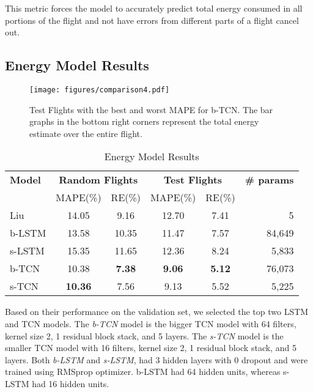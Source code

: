 \documentclass[letterpaper, 10 pt, conference]{ieeeconf}
\begin{document}
This metric forces the model to accurately predict total energy consumed in all portions of the flight and not have errors from different parts of a flight cancel out.


\subsection{Energy Model Results} \label{deep_results}
\begin{figure}
    \centering
    \texttt{[image: figures/comparison4.pdf]} 
\caption{Test Flights with the best and worst MAPE for b-TCN. The bar graphs in the bottom right corners represent the total energy estimate over the entire flight.}
    \label{fig:comparison}
\end{figure}
\begin{table}
    \centering
    \caption{Energy Model Results}
    \vspace{-2.5mm}
    \begin{tabular}{lccccr}
    \toprule
         \textbf{Model} & \multicolumn{2}{c}{\textbf{Random Flights}} & \multicolumn{2}{c}{\textbf{Test Flights}} & \textbf{\# params} \\
     \cmidrule{2-5}
          & MAPE(\%) & RE(\%) & MAPE(\%) & RE(\%) & \\
\midrule
    Liu \cite{liu2017power} &  14.05 & 9.16 &  12.70 & 7.41  &   5 \\
    b-LSTM &  13.58 & 10.35 &  11.47 & 7.57  &  84,649 \\
    s-LSTM &  15.35 & 11.65 &  12.36 & 8.24  &  5,833 \\
    b-TCN &   10.38 & \textbf{7.38} &  \textbf{9.06} & \textbf{5.12}  &   76,073 \\
    s-TCN &   \textbf{10.36} & 7.56 &  9.13 & 5.52 &  5,225 \\
    \bottomrule
    \end{tabular}
    \label{tab:comparison}
    \vspace{-2.5mm}
\end{table}

Based on their performance on the validation set, we selected the top two LSTM and TCN models. The \emph{b-TCN} model is the bigger TCN model with 64 filters, kernel size 2, 1 residual block stack, and 5 layers. The \emph{s-TCN} model is the smaller TCN model with 16 filters, kernel size 2, 1 residual block stack, and 5 layers. Both \emph{b-LSTM} and \emph{s-LSTM}, had 3 hidden layers with 0 dropout and were trained using RMSprop optimizer. b-LSTM had 64 hidden units, whereas s-LSTM had 16 hidden units.
\end{document}
